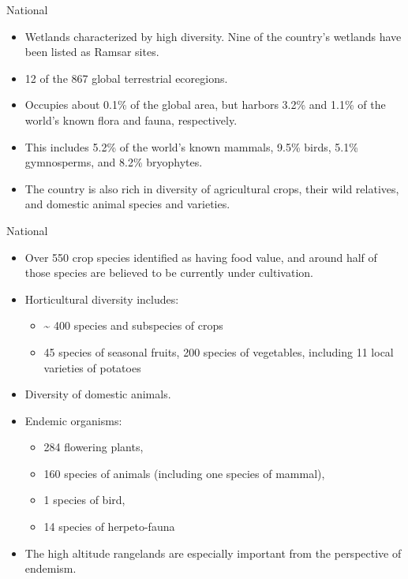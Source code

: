 \documentclass[
  ignorenonframetext,
  aspectratio=169]{beamer}
\providecommand{\tightlist}{%
  \setlength{\itemsep}{0pt}\setlength{\parskip}{0pt}}
\begin{document}
\begin{frame}{National}
\protect\hypertarget{national-2}{}
\begin{itemize}
\tightlist
\item
  Wetlands characterized by high diversity. Nine of the country's
  wetlands have been listed as Ramsar sites.
\item
  12 of the 867 global terrestrial ecoregions.
\item
  Occupies about 0.1\% of the global area, but harbors 3.2\% and 1.1\%
  of the world's known flora and fauna, respectively.
\item
  This includes 5.2\% of the world's known mammals, 9.5\% birds, 5.1\%
  gymnosperms, and 8.2\% bryophytes.
\item
  The country is also rich in diversity of agricultural crops, their
  wild relatives, and domestic animal species and varieties.
\end{itemize}
\end{frame}

\begin{frame}{National}
\protect\hypertarget{national-3}{}
\begin{itemize}
\tightlist
\item
  Over 550 crop species identified as having food value, and around half
  of those species are believed to be currently under cultivation.
\item
  Horticultural diversity includes:

  \begin{itemize}
  \tightlist
  \item
    \textasciitilde{} 400 species and subspecies of crops
  \item
    45 species of seasonal fruits, 200 species of vegetables, including
    11 local varieties of potatoes
  \end{itemize}
\item
  Diversity of domestic animals.
\item
  Endemic organisms:

  \begin{itemize}
  \tightlist
  \item
    284 flowering plants,
  \item
    160 species of animals (including one species of mammal),
  \item
    1 species of bird,
  \item
    14 species of herpeto-fauna
  \end{itemize}
\item
  The high altitude rangelands are especially important from the
  perspective of endemism.
\end{itemize}
\end{frame}
\end{document}

